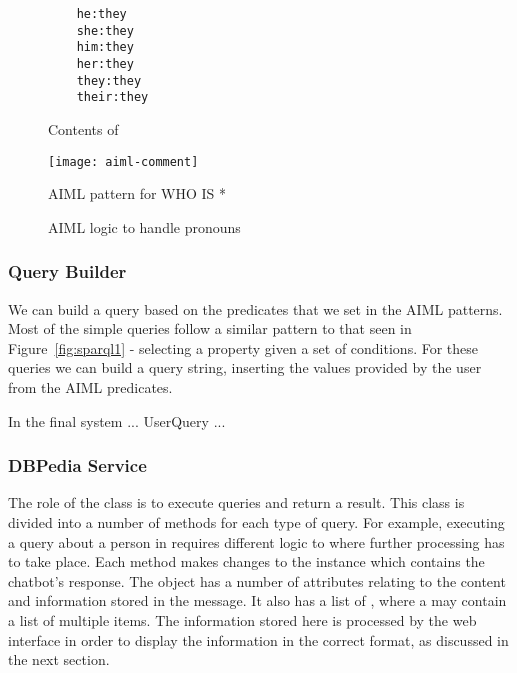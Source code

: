 \begin{figure}[h]
	\centering
	\begin{lstlisting}
	he:they
	she:they
	him:they
	her:they
	they:they
	their:they
	\end{lstlisting}
	\caption{Contents of }
	\label{fig:pronouns}
\end{figure}

\begin{figure}[pt]
	\centering
	\texttt{[image: aiml-comment]}
	\caption{AIML pattern for WHO IS *}
	\label{fig:aiml-comment}
	\qquad
	\caption{AIML logic to handle pronouns}
	\label{fig:aiml-pronouns}
\end{figure}

\newpage
\subsubsection{Query Builder}
We can build a query based on the predicates that we set in the AIML patterns. Most of the simple queries follow a similar pattern to that seen in Figure~\ref{fig:sparql1} - selecting a property given a set of conditions. For these queries we can build a query string, inserting the values provided by the user from the AIML predicates.

In the final system ... UserQuery ... 

\subsubsection{DBPedia Service}
The role of the  class is to execute queries and return a result. This class is divided into a number of methods for each type of query. For example, executing a query about a person in  requires different logic to  where further processing has to take place. Each method makes changes to the  instance which contains the chatbot's response. The  object has a number of attributes relating to the content and information stored in the message. It also has a list of , where a  may contain a list of multiple items. The information stored here is processed by the web interface in order to display the information in the correct format, as discussed in the next section.


